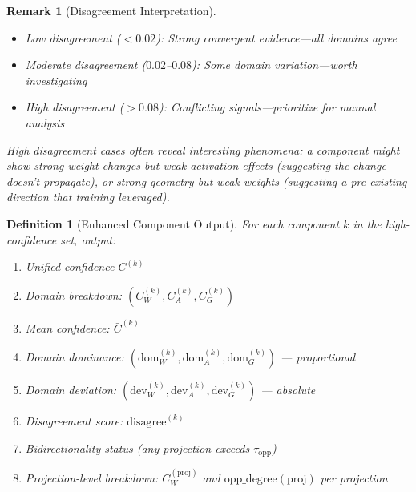 \documentclass[11pt]{article}
\newtheorem{definition}{Definition}[section]
\newtheorem{remark}{Remark}[section]
\begin{document}
\begin{remark}[Disagreement Interpretation]
\label{rem:disagreement-interpretation}
\begin{itemize}[nosep]
\item Low disagreement ($< 0.02$): Strong convergent evidence---all domains agree
\item Moderate disagreement ($0.02$--$0.08$): Some domain variation---worth investigating
\item High disagreement ($> 0.08$): Conflicting signals---prioritize for manual analysis
\end{itemize}
High disagreement cases often reveal interesting phenomena: a component might show strong weight changes but weak activation effects (suggesting the change doesn't propagate), or strong geometry but weak weights (suggesting a pre-existing direction that training leveraged).
\end{remark}

\begin{definition}[Enhanced Component Output]
\label{def:enhanced-component-output}
For each component $k$ in the high-confidence set, output:
\begin{enumerate}[nosep]
\item Unified confidence $C^{(k)}$
\item Domain breakdown: $(C^{(k)}_W, C^{(k)}_A, C^{(k)}_G)$
\item Mean confidence: $\bar{C}^{(k)}$
\item Domain dominance: $(\text{dom}_W^{(k)}, \text{dom}_A^{(k)}, \text{dom}_G^{(k)})$ --- proportional
\item Domain deviation: $(\text{dev}_W^{(k)}, \text{dev}_A^{(k)}, \text{dev}_G^{(k)})$ --- absolute
\item Disagreement score: $\text{disagree}^{(k)}$
\item Bidirectionality status (any projection exceeds $\tau_{\text{opp}}$)
\item Projection-level breakdown: $C^{(\text{proj})}_W$ and $\text{opp\_degree}(\text{proj})$ per projection
\end{enumerate}
\end{definition}
\end{document}
